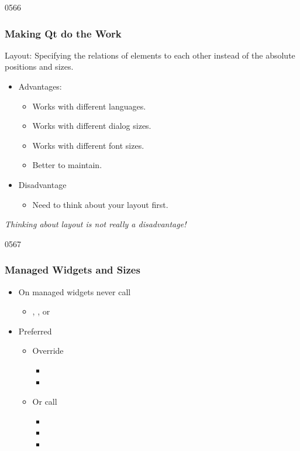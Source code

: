 \begin{slide}{0566}\frametitle{Making Qt do the Work}
\begin{definition}{Layout: }
  Specifying the relations of elements to each other
  instead of the absolute positions and sizes.
\end{definition}    
\begin{itemize}
 \item Advantages: 
    \begin{itemize}
    \item Works with different languages.
    \item Works with different dialog sizes.
    \item Works with different font sizes.
    \item Better to maintain.
   \end{itemize}
  \item Disadvantage
    \begin{itemize}
    \item Need to think about your layout first.
    \end{itemize}
  \end{itemize}
  \vfill
  \textit{Thinking about layout is not really a disadvantage!}
\end{slide}
\begin{slide}{0567}\frametitle{Managed Widgets and Sizes}
\begin{itemize}
\item  On managed widgets never call 
  \begin{itemize}
  \item {}, , or
  \end{itemize}
\item Preferred
  \begin{itemize}
  \item Override 
  \begin{itemize}
	  \item {}
	  \item {}
  \end{itemize}
  \item Or call 
  \begin{itemize}
	  \item {}
	  \item {}
	  \item {}
  \end{itemize}
  \end{itemize}
\end{itemize}
\end{slide}

